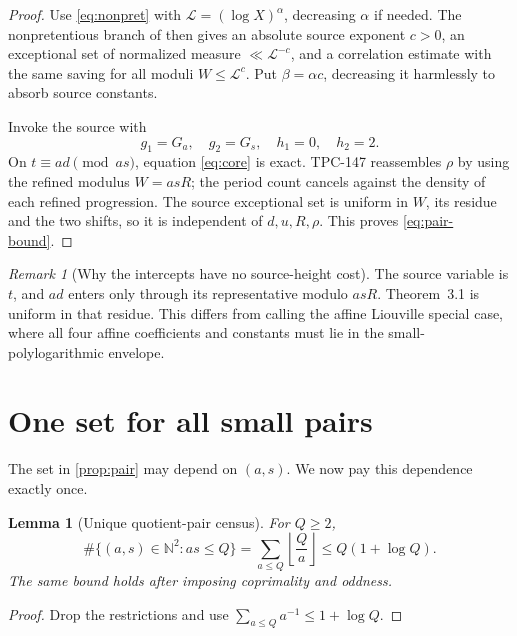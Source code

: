 \documentclass[11pt]{article}
\newtheorem{lemma}[theorem]{Lemma}
\theoremstyle{definition}
\theoremstyle{remark}
\newtheorem{remark}[theorem]{Remark}
\begin{document}
\begin{proof}
Use \eqref{eq:nonpret} with
\(\mathcal L=(\log X)^\alpha\), decreasing \(\alpha\) if needed.
The nonpretentious branch of
\citet[Theorem~3.1]{TaoTeravainen2026} then gives an absolute source
exponent \(c>0\), an exceptional set of normalized measure
\(\ll\mathcal L^{-c}\), and a correlation estimate with the same
saving for all moduli \(W\le\mathcal L^c\).  Put
\(\beta=\alpha c\), decreasing it harmlessly to absorb source
constants.

Invoke the source with
\[
 g_1=G_a,\quad g_2=G_s,\quad h_1=0,\quad h_2=2.
\]
On \(t\equiv ad\pmod{as}\), equation \eqref{eq:core} is exact.
TPC-147 reassembles \(\rho\) by using the refined modulus
\(W=asR\); the period count cancels against the density of each
refined progression.  The source exceptional set is uniform in
\(W\), its residue and the two shifts, so it is independent of
\(d,u,R,\rho\).  This proves \eqref{eq:pair-bound}.
\end{proof}

\begin{remark}[Why the intercepts have no source-height cost]
The source variable is \(t\), and \(ad\) enters only through its
representative modulo \(asR\).  Theorem~3.1 is uniform in that
residue.  This differs from calling the affine Liouville special
case, where all four affine coefficients and constants must lie in
the small-polylogarithmic envelope.
\end{remark}

\section{One set for all small pairs}

The set in \cref{prop:pair} may depend on \((a,s)\).  We now pay this
dependence exactly once.

\begin{lemma}[Unique quotient-pair census]
\label{lem:pairs}
For \(Q\ge2\),
\begin{equation}
 \#\{(a,s)\in\mathbb N^2:as\le Q\}
 =
 \sum_{a\le Q}\left\lfloor\frac Qa\right\rfloor
 \le Q(1+\log Q).
\label{eq:pairs}
\end{equation}
The same bound holds after imposing coprimality and oddness.
\end{lemma}

\begin{proof}
Drop the restrictions and use
\(\sum_{a\le Q}a^{-1}\le1+\log Q\).
\end{proof}
\end{document}
